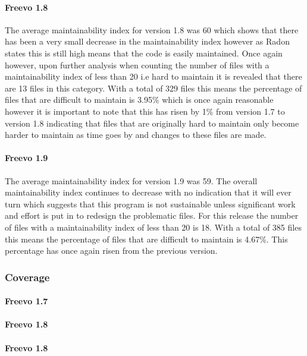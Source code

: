 \documentclass[10.5pt,journal, a4paper]{IEEEtran}
\begin{document}
\paragraph{Freevo 1.8}
\noindent
The average maintainability index for version 1.8 was 60 which shows that there has been a very small decrease in the maintainability index however as Radon states this is still high means that the code is easily maintained. Once again however, upon further analysis when counting the number of files with a maintainability index of less than 20 i.e hard to maintain it is revealed that there are 13 files in this category. With a total of 329 files this means the percentage of files that are difficult to maintain is 3.95\% which is once again reasonable however it is important to note that this has risen by 1\% from version 1.7 to version 1.8 indicating that files that are originally hard to maintain only become harder to maintain as time goes by and changes to these files are made.



\paragraph{Freevo 1.9}
\noindent
The average maintainability index for version 1.9 was 59. The overall maintainability index continues to decrease with no indication that it will ever turn which suggests that this program is not sustainable unless significant work and effort is put in to redesign the problematic files. For this release the number of files with a maintainability index of less than 20 is 18. With a total of 385 files this means the percentage of files that are difficult to maintain is 4.67\%. This percentage has once again risen from the previous version. 




\subsubsection{Coverage}

\paragraph{Freevo 1.7}


\paragraph{Freevo 1.8}


\paragraph{Freevo 1.8}
\end{document}
